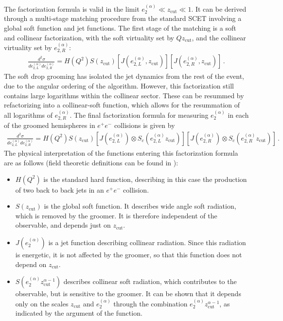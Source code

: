 \documentclass[a4paper,11pt]{article}
\newcommand{\ecf}[2]{e_{#1}^{(#2)}}
\def\zcut{z_{\text{cut}}}
\begin{document}
The factorization formula is valid in the limit $\ecf{2}{\alpha} \ll \zcut\ll 1$. It can be derived through a multi-stage matching procedure from the standard SCET involving a global soft function and jet functions. The first stage of the matching is a soft and collinear factorization, with the soft virtuality set by $Q\zcut$, and the collinear virtuality set by $\ecf{2,R}{\alpha}$:
\begin{align}\label{eq:sd_mother}
\frac{d^2\sigma}{d\ecf{2,L}{\alpha} d\ecf{2,R}{\alpha} }= H(Q^2) S(\zcut) \left[ J(\ecf{2,L}{\alpha},\zcut)  \right]\left[ J(\ecf{2,R}{\alpha}, \zcut)  \right]\,.
\end{align}
The soft drop grooming has isolated the jet dynamics from the rest of the event, due to the angular ordering of the algorithm. However, this factorization still contains large logarithms within the collinear sector. These can be resummed by refactorizing into a collinear-soft function, which allows for the resummation of all logarithms of $\ecf{2,R}{\alpha}$. The final factorization formula for measuring $\ecf{2}{\alpha}$ in each of the groomed hemispheres in $e^+e^-$ collisions is given by
\begin{align}\label{eq:sd_mass}
\frac{d^2\sigma}{d\ecf{2,L}{\alpha} d\ecf{2,R}{\alpha} }= H(Q^2) S(\zcut) \left[ J(\ecf{2,L}{\alpha}) \otimes S_c(\ecf{2,L}{\alpha} \zcut)  \right]\left[ J(\ecf{2,R}{\alpha}) \otimes S_c(\ecf{2,R}{\alpha} \zcut)  \right]\,.
\end{align}
%
The physical interpretation of the functions entering this factorization formula are as follows (field theoretic definitions can be found in \cite{Frye:2016okc,Frye:2016aiz}):
\begin{itemize}
\item $H(Q^2)$ is the standard hard function, describing in this case the production of two back to back jets in an $e^+e^-$ collision.
\item $S(\zcut)$ is the global soft function. It describes wide angle soft radiation, which is removed by the groomer. It is therefore independent of the observable, and depends just on $\zcut$.
\item $J(\ecf{2}{\alpha})$ is a jet function describing collinear radiation. Since this radiation is energetic, it is not affected by the groomer, so that this function does not depend on $\zcut$.
\item $S(\ecf{2}{\alpha} \zcut^{\alpha-1})$ describes collinear soft radiation, which contributes to the observable, but is sensitive to the groomer. It can be shown that it depends only on the scales $\zcut$ and $\ecf{2}{\alpha}$ through the combination $\ecf{2}{\alpha}\zcut^{\alpha-1}$, as indicated by the argument of the function.
\end{itemize}
\end{document}
